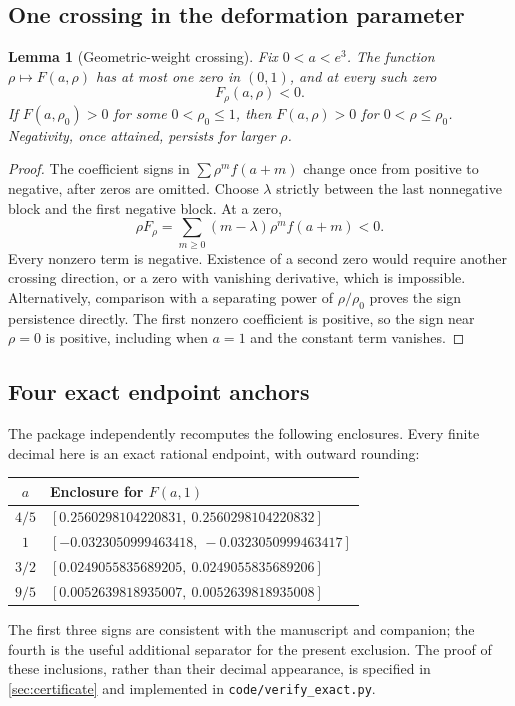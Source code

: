 \documentclass[11pt]{article}
\numberwithin{equation}{section}
\newtheorem{lemma}[lemma]{Lemma}
\theoremstyle{definition}
\begin{document}
\subsection{One crossing in the deformation parameter}
\begin{lemma}[Geometric-weight crossing]\label{lem:rhocross}
Fix $0<a<e^3$. The function $\rho\mapsto F(a,\rho)$ has at most one zero in
$(0,1)$, and at every such zero
\begin{equation}\label{eq:Frhoneg}
 F_\rho(a,\rho)<0.
\end{equation}
If $F(a,\rho_0)>0$ for some $0<\rho_0\leq1$, then $F(a,\rho)>0$ for
$0<\rho\leq\rho_0$. Negativity, once attained, persists for larger $\rho$.
\end{lemma}
\begin{proof}
The coefficient signs in $\sum\rho^m f(a+m)$ change once from positive to
negative, after zeros are omitted. Choose $\lambda$ strictly between the
last nonnegative block and the first negative block. At a zero,
\[
 \rho F_\rho=\sum_{m\geq0}(m-\lambda)\rho^m f(a+m)<0.
\]
Every nonzero term is negative. Existence of a second zero would require
another crossing direction, or a zero with vanishing derivative, which is
impossible. Alternatively, comparison with a separating power of
$\rho/\rho_0$ proves the sign persistence directly. The first nonzero
coefficient is positive, so the sign near $\rho=0$ is positive, including
when $a=1$ and the constant term vanishes.
\end{proof}

\subsection{Four exact endpoint anchors}
The package independently recomputes the following enclosures. Every finite
decimal here is an exact rational endpoint, with outward rounding:
\begin{center}
\begin{tabular}{cl}
\toprule
$a$ & Enclosure for $F(a,1)$\\
\midrule
$4/5$ & $[0.2560298104220831,\ 0.2560298104220832]$\\
$1$ & $[-0.0323050999463418,\ -0.0323050999463417]$\\
$3/2$ & $[0.0249055835689205,\ 0.0249055835689206]$\\
$9/5$ & $[0.0052639818935007,\ 0.0052639818935008]$\\
\bottomrule
\end{tabular}
\end{center}
The first three signs are consistent with the manuscript and companion;
the fourth is the useful additional separator for the present exclusion.
The proof of these inclusions, rather than their decimal appearance, is
specified in \cref{sec:certificate} and implemented in
\texttt{code/verify\_exact.py}.
\end{document}
